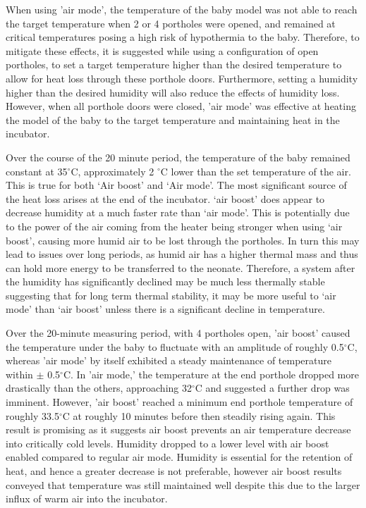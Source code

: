 \documentclass{article}
\begin{document}
\vspace{3mm}

When using 'air mode', the temperature of the baby model was not able to reach the target temperature when 2 or 4 portholes were opened, and remained at critical temperatures posing a high risk of hypothermia to the baby. Therefore, to mitigate these effects, it is suggested while using a configuration of open portholes, to set a target temperature higher than the desired temperature to allow for heat loss through these porthole doors. Furthermore, setting a humidity higher than the desired humidity will also reduce the effects of humidity loss. However, when all porthole doors were closed, 'air mode' was effective at heating the model of the baby to the target temperature and maintaining heat in the incubator.

\vspace{3mm}

Over the course of the 20 minute period, the temperature of the baby remained constant at 35$^{\circ}$C, approximately 2 $^{\circ}$C lower than the set temperature of the air. This is true for both ‘Air boost’ and ‘Air mode’. The most significant source of the heat loss arises at the end of the incubator. ‘air boost’ does appear to decrease humidity at a much faster rate than ‘air mode’. This is potentially due to the power of the air coming from the heater being stronger when using ‘air boost’, causing more humid air to be lost through the portholes. In turn this may lead to issues over long periods, as humid air has a higher thermal mass and thus can hold more energy to be transferred to the neonate. Therefore, a system after the humidity has significantly declined may be much less thermally stable suggesting that for long term thermal stability, it may be more useful to ‘air mode’ than ‘air boost’ unless there is a significant decline in temperature.

\vspace{3mm}

Over the 20-minute measuring period, with 4 portholes open, 'air boost' caused the temperature under the baby to fluctuate with an amplitude of roughly 0.5$^{\circ}$C, whereas 'air mode' by itself exhibited a steady maintenance of temperature within $\pm$ 0.5$^{\circ}$C. In 'air mode,' the temperature at the end porthole dropped more drastically than the others, approaching 32$^{\circ}$C and suggested a further drop was imminent. However, 'air boost' reached a minimum end porthole temperature of roughly 33.5$^{\circ}$C at roughly 10 minutes before then steadily rising again. This result is promising as it suggests air boost prevents an air temperature decrease into critically cold levels. Humidity dropped to a lower level with air boost enabled compared to regular air mode. Humidity is essential for the retention of heat, and hence a greater decrease is not preferable, however air boost results conveyed that temperature was still maintained well despite this due to the larger influx of warm air into the incubator.
\end{document}
